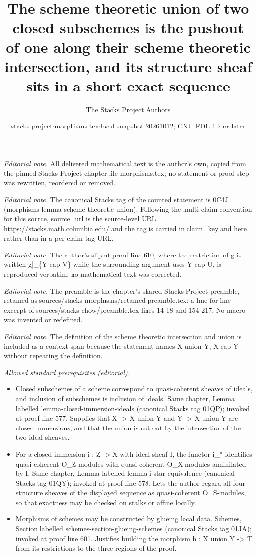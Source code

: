 \documentclass[10pt,a4paper]{amsart}
\title{The scheme theoretic union of two closed subschemes is the pushout of one along their scheme theoretic intersection, and its structure sheaf sits in a short exact sequence}
\author{The Stacks Project Authors}
\date{stacks-project:morphisms.tex:local-snapshot-20261012; GNU FDL 1.2 or later}
\theoremstyle{plain}
\theoremstyle{definition}
\theoremstyle{remark}
\numberwithin{equation}{subsection}
\begin{document}
\maketitle
\noindent\textit{Editorial note.} All delivered mathematical text is the author's own, copied from the pinned Stacks Project chapter file morphisms.tex; no statement or proof step was rewritten, reordered or removed.\par\medskip
\noindent\textit{Editorial note.} The canonical Stacks tag of the counted statement is 0C4J (morphisms-lemma-scheme-theoretic-union). Following the multi-claim convention for this source, source\_url is the source-level URL https://stacks.math.columbia.edu/ and the tag is carried in claim\_key and here rather than in a per-claim tag URL.\par\medskip
\noindent\textit{Editorial note.} The author's slip at proof line 610, where the restriction of g is written g|\_\{Y cap V\} while the surrounding argument uses Y cap U, is reproduced verbatim; no mathematical text was corrected.\par\medskip
\noindent\textit{Editorial note.} The preamble is the chapter's shared Stacks Project preamble, retained as sources/stacks-morphisms/retained-preamble.tex: a line-for-line excerpt of sources/stacks-chow/preamble.tex lines 14-18 and 154-217. No macro was invented or redefined.\par\medskip
\noindent\textit{Editorial note.} The definition of the scheme theoretic intersection and union is included as a context span because the statement names X union Y, X cap Y without repeating the definition.\par\medskip
\noindent\textit{Allowed standard prerequisites (editorial).}\begin{itemize}
\item Closed subschemes of a scheme correspond to quasi-coherent sheaves of ideals, and inclusion of subschemes is inclusion of ideals. Same chapter, Lemma labelled lemma-closed-immersion-ideals (canonical Stacks tag 01QP); invoked at proof line 577. Supplies that X -> X union Y and Y -> X union Y are closed immersions, and that the union is cut out by the intersection of the two ideal sheaves.
\item For a closed immersion i : Z -> X with ideal sheaf I, the functor i\_* identifies quasi-coherent O\_Z-modules with quasi-coherent O\_X-modules annihilated by I. Same chapter, Lemma labelled lemma-i-star-equivalence (canonical Stacks tag 01QY); invoked at proof line 578. Lets the author regard all four structure sheaves of the displayed sequence as quasi-coherent O\_S-modules, so that exactness may be checked on stalks or affine locally.
\item Morphisms of schemes may be constructed by glueing local data. Schemes, Section labelled schemes-section-glueing-schemes (canonical Stacks tag 01JA); invoked at proof line 601. Justifies building the morphism h : X union Y -> T from its restrictions to the three regions of the proof.
\end{itemize}\medskip
\end{document}
